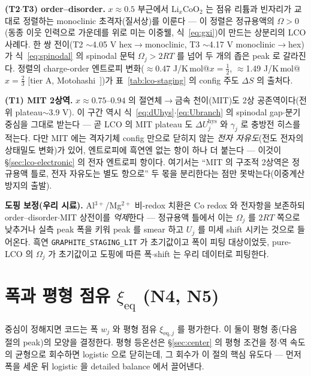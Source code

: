 \documentclass[11pt,a4paper]{article}
\newcommand{\eq}{\mathrm{eq}}
\newcommand{\hys}{\mathrm{hys}}
\newcommand{\code}[1]{\texttt{#1}}
\begin{document}
\textbf{(T2$\cdot$T3) order--disorder.} $x\approx0.5$ 부근에서 $\mathrm{Li}_x\mathrm{CoO_2}$ 는 점유 리튬과 빈자리가
교대로 정렬하는 monoclinic 초격자(질서상)를 이룬다 — 이 정렬은 정규용액의 $\Omega>0$(동종 이웃 인력으로 가운데를 위로
미는 이중웰, 식~\eqref{eq:gxi})이 만드는 상분리의 LCO 사례다. 한 쌍 전이(T2 $\sim$4.05 V hex$\to$monoclinic,
T3 $\sim$4.17 V monoclinic$\to$hex)가 식~\eqref{eq:spinodal} 의 spinodal 문턱 $\Omega_j>2RT$ 를 넘어 두 개의 좁은
peak 로 갈라진다. 정렬의 charge-order 엔트로피 변화($\approx$0.47 J/K\,mol@$x{=}\tfrac12$, $\approx$1.49 J/K\,mol@$x{=}\tfrac23$
[tier A, Motohashi~\cite{motohashi2009}])가 표~\ref{tab:lco-staging} 의 config 주도 $\Delta S$ 의 출처다.

\textbf{(T1) MIT 2상역.} $x\approx0.75$--$0.94$ 의 절연체$\to$금속 천이(MIT)도 2상 공존역이다(전위 plateau$\sim$3.9 V).
이 구간 역시 식~\eqref{eq:dUhys}$\cdot$\eqref{eq:Ubranch} 의 spinodal gap$\cdot$분기 중심을 그대로 받는다 — 곧 LCO 의
MIT plateau 도 $\Delta U_j^\hys$ 와 $\gamma_j$ 로 충방전 히스를 적는다. 다만 MIT 에는 격자기체 config 만으로 닫히지 않는
\emph{전자 자유도}(전도 전자의 상태밀도 변화)가 있어, 엔트로피에 흑연엔 없는 항이 하나 더 붙는다 — 이것이
\S\ref{sec:lco-electronic} 의 전자 엔트로피 항이다. 여기서는 ``MIT 의 구조적 2상역은 정규용액 틀로, 전자 자유도는 별도
항으로'' 두 몫을 분리한다는 점만 못박는다(이중계산 방지의 출발).

\textbf{도핑 보정(우리 시료).} Al$^{3+}$/Mg$^{2+}$ 비-redox 치환은 Co redox 와 전자항을 보존하되 order--disorder$\cdot$MIT
상전이를 \emph{억제}한다 — 정규용액 틀에서 이는 $\Omega_j$ 를 $2RT$ 쪽으로 낮추거나 실측 peak 폭을 키워
peak 를 smear 하고 $U_j$ 를 미세 shift 시키는 것으로 들어온다. 흑연 \code{GRAPHITE\_STAGING\_LIT} 가 초기값이고 폭이
피팅 대상이었듯, pure-LCO 의 $\Omega_j$ 가 초기값이고 도핑에 따른 폭$\cdot$shift 는 우리 데이터로 피팅한다.

\section{폭과 평형 점유 $\xi_\eq$ (N4, N5)}\label{sec:width}
중심이 정해지면 코드는 폭 $w_j$ 와 평형 점유 $\xi_{\eq,j}$ 를 평가한다. 이 둘이 평형 종(다음 절의 peak)의 모양을
결정한다. 평형 등온선은 \S\ref{sec:center} 의 평형 조건을 정$\cdot$역 속도의 균형으로 회수하면 logistic 으로 닫히는데,
그 회수가 이 절의 핵심 유도다 — 먼저 폭을 세운 뒤 logistic 을 detailed balance 에서 끌어낸다.
\end{document}
